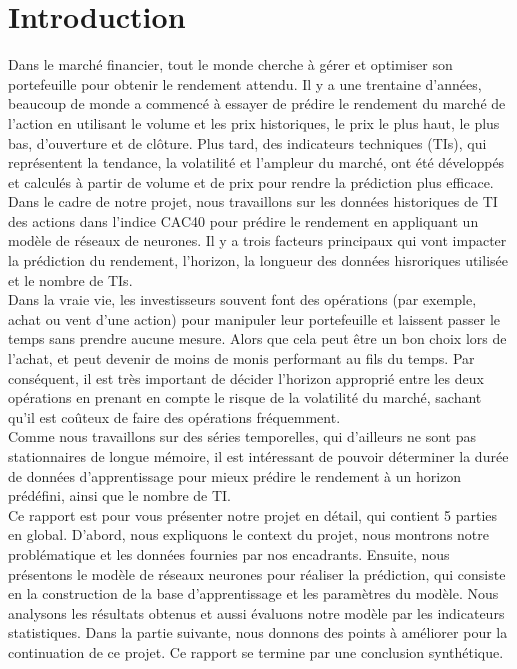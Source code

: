 
\section{Introduction}

Dans le marché financier, tout le monde cherche à gérer et optimiser son portefeuille pour obtenir le rendement attendu. Il y a une trentaine d'années, beaucoup de monde a commencé à essayer de prédire le rendement du marché de l'action en utilisant le volume et les prix historiques, le prix le plus haut, le plus bas, d'ouverture et de clôture. Plus tard, des indicateurs techniques (TIs), qui représentent la tendance, la volatilité et l'ampleur du marché, ont été développés et calculés à partir de volume et de prix pour rendre la prédiction plus efficace.\\

Dans le cadre de notre projet, nous travaillons sur les données historiques de TI des actions dans l'indice CAC40 pour prédire le rendement en appliquant un modèle de réseaux de neurones. Il y a trois facteurs principaux qui vont impacter la prédiction du rendement, l'horizon, la longueur des données hisroriques utilisée et le nombre de TIs.\\

Dans la vraie vie, les investisseurs souvent font des opérations (par exemple, achat ou vent d'une action) pour manipuler leur portefeuille et laissent passer le temps sans prendre aucune mesure. Alors que cela peut être un bon choix lors de l'achat, et peut devenir de moins de monis performant au fils du temps. Par conséquent, il est très important de décider l'horizon approprié entre les deux opérations en prenant en compte le risque de la volatilité du marché, sachant qu'il est coûteux de faire des opérations fréquemment.\\

Comme nous travaillons sur des séries temporelles, qui d'ailleurs ne sont pas stationnaires de longue mémoire, il est intéressant de pouvoir déterminer la durée de données d'apprentissage pour mieux prédire le rendement à un horizon prédéfini, ainsi que le nombre de TI.\\

Ce rapport est pour vous présenter notre projet en détail, qui contient 5 parties en global. D’abord, nous expliquons le context du projet, nous montrons notre problématique et les données fournies par nos encadrants. Ensuite, nous présentons le modèle de réseaux neurones pour réaliser la prédiction, qui consiste en la construction de la base d’apprentissage et les paramètres du modèle. Nous analysons les résultats obtenus et aussi évaluons notre modèle par les indicateurs statistiques. Dans la partie suivante, nous donnons des points à améliorer pour la continuation de ce projet. Ce rapport se termine par une conclusion synthétique. 


